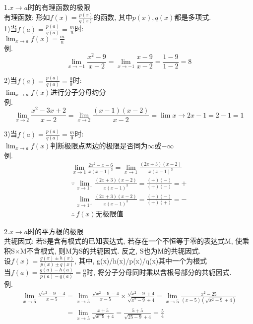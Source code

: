 \documentclass[UTF8, fontset=ubuntu]{ctexart}
\begin{document}
1.$x\to a$时的有理函数的极限\\
有理函数: 形如$f(x)=\frac{p(x)}{q(x)}$的函数, 其中$p(x),q(x)$都是多项式.\\
1)当$f(a)=\frac{p(a)}{q(a)}=\frac{m}{n}$时:\\
$\displaystyle\lim_{x\to a}f(x)=\frac{m}{n}$\\
例.
\[\lim_{x\to -1}\frac{x^2-9}{x-2}=\lim_{x\to -1}\frac{x-9}{x-2}=\frac{1-9}{1-2}=8\]

2)当$f(a)=\frac{p(a)}{q(a)}=\frac{0}{0}$时:\\
$\displaystyle\lim_{x\to a}f(x)$进行分子分母约分\\
例.
\[\lim_{x\to 2}\frac{x^2-3x+2}{x-2}=\lim_{x\to 2}\frac{(x-1)(x-2)}{x-2}=\lim{x\to 2}x-1=2-1=1\]

3)当$f(a)=\frac{p(a)}{q(a)}=\frac{m}{0}$时:\\
$\displaystyle\lim_{x\to a}f(x)$判断极限点两边的极限是否同为$\infty$或$-\infty$\\
例.
\begin{displaymath}
\begin{array}{l}
    \displaystyle\lim_{x\to 1}\frac{2x^2-x-6}{x(x-1)^3}=\lim_{x\to 1}\frac{(2x+3)(x-2)}{x(x-1)^3}\\
	\displaystyle\mathbf{\because}\lim_{x\to 1^-}\frac{(2x+3)(x-2)}{x(x-1)^3}=\frac{(+)(-)}{(+)(-)}=+\\
    \displaystyle\phantom{\because}\lim_{x\to 1^+}\frac{(2x+3)(x-2)}{x(x-1)^3}=\frac{(+)(-)}{(+)(+)}=-\\
	\displaystyle\mathbf{\therefore}\,f(x)\text{无极限值}
\end{array}
\end{displaymath}\vspace{2ex}

2.$x\to a$时的平方根的极限\\
共轭因式: 若S是含有根式的已知表达式, 若存在一个不恒等于零的表达式M, 使乘积S$\times$M不含根式, 则M为S的共轭因式. 反之, S也为M的共轭因式.\\
设$f(x)=\frac{g(x)\pm h(x)}{p(x)\pm q(x)}$, 其中, g(x)/h(x)/p(x)/q(x)其中一个为根式\\
当$f(a)=\frac{g(a)-h(a)}{p(a)-q(a)}=\frac{0}{0}$时, 将分子分母同时乘以含根号部分的共轭因式.\\
例.
\begin{displaymath}
\begin{array}{l}
    \displaystyle\lim_{x\to 5}\frac{\sqrt{x^2-9}-4}{x-5}=\lim_{x\to 5}\frac{\sqrt{x^2-9}-4}{x-5}\times\frac{\sqrt{x^2-9}+4}{\sqrt{x^2-9}+4}=\lim_{x\to 5}\frac{x^2-25}{(x-5)(\sqrt{x^2-9}+4)}\\
    \displaystyle\phantom{\lim_{x\to 5}\frac{\sqrt{x^2-9}-4}{x-5}}=\lim_{x\to 5}\frac{x+5}{\sqrt{x^-9}+4}=\frac{5+5}{\sqrt{25-9}+4}=\frac{5}{4}
\end{array}
\end{displaymath}\vspace{2ex}
\end{document}
